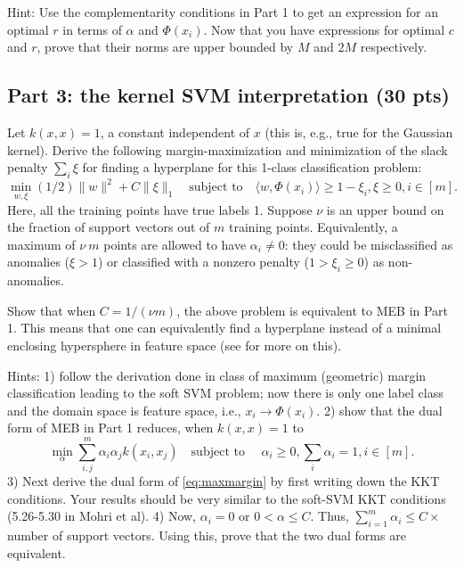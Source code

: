 \documentclass[12pt]{article}
\begin{document}
Hint: Use the complementarity conditions in Part 1 to get an expression for an optimal $r$ in terms of $\alpha$ and $\Phi(x_i)$. Now that you have expressions for optimal $c$ and $r$, prove that their norms are upper bounded by $M$ and $2M$ respectively.

\subsection*{Part 3: the kernel SVM interpretation (30 pts)} 

Let $k(x,x) = 1$, a constant independent of $x$ (this is, e.g., true for the Gaussian kernel). Derive the following margin-maximization and minimization of the slack penalty $\sum_i \xi$ for finding a hyperplane for this 1-class classification problem:
\begin{equation}
	\label{eq:maxmargin}
	\min_{w, \xi} (1/2)\|w\|^2 + C \|\xi\|_1 \quad 
	\text{subject to} \quad \langle w,\Phi(x_i)\rangle \geq 1 - \xi_i, \xi \geq 0, i \in [m].
\end{equation}
Here, all the training points have true labels 1. Suppose $\nu$ is an upper bound on the fraction of support vectors out of $m$ training points. Equivalently, a maximum of $\nu \: m$ points are allowed to have $\alpha_i \neq 0$: they could be misclassified as anomalies ($\xi > 1$) or classified with a nonzero penalty ($1 > \xi_i \geq 0$) as non-anomalies.

Show that when $C = 1/(\nu m)$, the above problem is equivalent to MEB in Part 1. This means that one can equivalently find a hyperplane instead of a minimal enclosing hypersphere in feature space (see \cite{schol} for more on this).

\vspace{0.1in}
Hints: 1) follow the derivation done in class of maximum (geometric) margin classification leading to the soft SVM problem; now there is only one label class and the domain space is feature space, i.e., $x_i \to \Phi(x_i).$ 2) show that the dual form of MEB in Part 1 reduces, when $k(x,x)=1$ to \begin{equation}
	\min_\alpha \sum_{i,j}^m \alpha_i \alpha_j k(x_i, x_j) \quad \text{subject to } \quad \alpha_i \geq 0, \sum_i \alpha_i = 1, i \in [m].
\end{equation}
3) Next derive the dual form of \eqref{eq:maxmargin} by first writing down the KKT conditions. Your results should be very similar to the soft-SVM KKT conditions (5.26-5.30 in Mohri et al).
4) Now, $\alpha_i = 0$ or $0 < \alpha \leq C$. Thus, $\sum_{i=1}^m \alpha_i \leq C \times $ number of support vectors. Using this, prove that the two dual forms are equivalent.  



\end{document}
